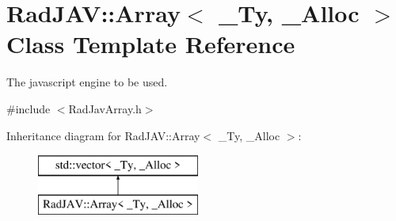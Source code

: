 \hypertarget{class_rad_j_a_v_1_1_array}{}\section{Rad\+J\+AV\+:\+:Array$<$ \+\_\+\+Ty, \+\_\+\+Alloc $>$ Class Template Reference}
\label{class_rad_j_a_v_1_1_array}


The javascript engine to be used.  




{\ttfamily \#include $<$Rad\+Jav\+Array.\+h$>$}

Inheritance diagram for Rad\+J\+AV\+:\+:Array$<$ \+\_\+\+Ty, \+\_\+\+Alloc $>$\+:\begin{figure}[H]
\begin{center}
\leavevmode
\includegraphics[height=2.000000cm]{class_rad_j_a_v_1_1_array}
\end{center}
\end{figure}
